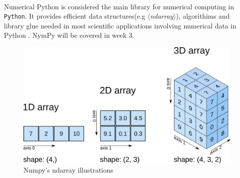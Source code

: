 \documentclass{tufte-handout}
\newcommand{\docopt}[1]{\ensuremath{\langle}\textrm{\textit{#1}}\ensuremath{\rangle}}%
\newcommand{\doccls}[1]{\texttt{#1}}%
\begin{document}
\\Numerical Python is considered the main library for numerical computing in \doccls{Python}. It provides efficient data structures(e.g \docopt{ndarray}), algorithims and library glue needed in most scientific applications involving numerical data in Python \cite{Mckinney2018}. NymPy will be covered in week 3.
\begin{figure}[h]%
  \includegraphics[width=\linewidth]{numpy.png}
  \caption{Numpy's ndarray illustrations}
  \label{fig:packages}
\end{figure}
\end{document}
